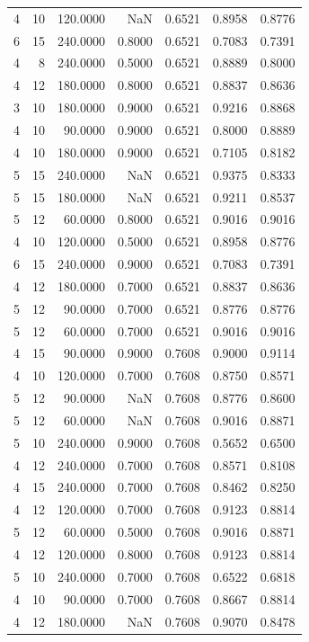 \begin{tabular}{rrrrrrr}
4 & 10 & 120.0000 & NaN & 0.6521 & 0.8958 & 0.8776 \\
6 & 15 & 240.0000 & 0.8000 & 0.6521 & 0.7083 & 0.7391 \\
4 & 8 & 240.0000 & 0.5000 & 0.6521 & 0.8889 & 0.8000 \\
4 & 12 & 180.0000 & 0.8000 & 0.6521 & 0.8837 & 0.8636 \\
3 & 10 & 180.0000 & 0.9000 & 0.6521 & 0.9216 & 0.8868 \\
4 & 10 & 90.0000 & 0.9000 & 0.6521 & 0.8000 & 0.8889 \\
4 & 10 & 180.0000 & 0.9000 & 0.6521 & 0.7105 & 0.8182 \\
5 & 15 & 240.0000 & NaN & 0.6521 & 0.9375 & 0.8333 \\
5 & 15 & 180.0000 & NaN & 0.6521 & 0.9211 & 0.8537 \\
5 & 12 & 60.0000 & 0.8000 & 0.6521 & 0.9016 & 0.9016 \\
4 & 10 & 120.0000 & 0.5000 & 0.6521 & 0.8958 & 0.8776 \\
6 & 15 & 240.0000 & 0.9000 & 0.6521 & 0.7083 & 0.7391 \\
4 & 12 & 180.0000 & 0.7000 & 0.6521 & 0.8837 & 0.8636 \\
5 & 12 & 90.0000 & 0.7000 & 0.6521 & 0.8776 & 0.8776 \\
5 & 12 & 60.0000 & 0.7000 & 0.6521 & 0.9016 & 0.9016 \\
4 & 15 & 90.0000 & 0.9000 & 0.7608 & 0.9000 & 0.9114 \\
4 & 10 & 120.0000 & 0.7000 & 0.7608 & 0.8750 & 0.8571 \\
5 & 12 & 90.0000 & NaN & 0.7608 & 0.8776 & 0.8600 \\
5 & 12 & 60.0000 & NaN & 0.7608 & 0.9016 & 0.8871 \\
5 & 10 & 240.0000 & 0.9000 & 0.7608 & 0.5652 & 0.6500 \\
4 & 12 & 240.0000 & 0.7000 & 0.7608 & 0.8571 & 0.8108 \\
4 & 15 & 240.0000 & 0.7000 & 0.7608 & 0.8462 & 0.8250 \\
4 & 12 & 120.0000 & 0.7000 & 0.7608 & 0.9123 & 0.8814 \\
5 & 12 & 60.0000 & 0.5000 & 0.7608 & 0.9016 & 0.8871 \\
4 & 12 & 120.0000 & 0.8000 & 0.7608 & 0.9123 & 0.8814 \\
5 & 10 & 240.0000 & 0.7000 & 0.7608 & 0.6522 & 0.6818 \\
4 & 10 & 90.0000 & 0.7000 & 0.7608 & 0.8667 & 0.8814 \\
4 & 12 & 180.0000 & NaN & 0.7608 & 0.9070 & 0.8478 \\

\end{tabular}
